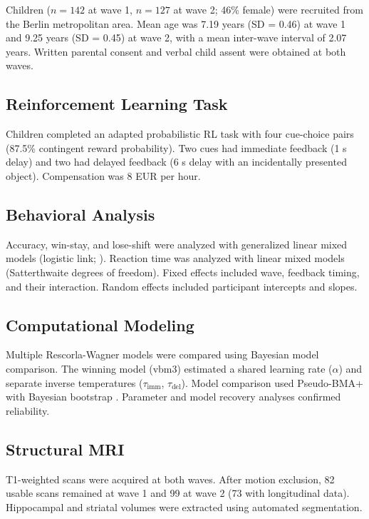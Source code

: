 \documentclass[11pt]{article}
\begin{document}
Children ($n = 142$ at wave 1, $n = 127$ at wave 2; 46\% female) were recruited from the Berlin metropolitan area. Mean age was 7.19 years (SD = 0.46) at wave 1 and 9.25 years (SD = 0.45) at wave 2, with a mean inter-wave interval of 2.07 years. Written parental consent and verbal child assent were obtained at both waves.

\subsection{Reinforcement Learning Task}

Children completed an adapted probabilistic RL task with four cue-choice pairs (87.5\% contingent reward probability). Two cues had immediate feedback (1 s delay) and two had delayed feedback (6 s delay with an incidentally presented object). Compensation was 8 EUR per hour.

\subsection{Behavioral Analysis}

Accuracy, win-stay, and lose-shift were analyzed with generalized linear mixed models (logistic link; \citealt{bates2015}). Reaction time was analyzed with linear mixed models (Satterthwaite degrees of freedom). Fixed effects included wave, feedback timing, and their interaction. Random effects included participant intercepts and slopes.

\subsection{Computational Modeling}

Multiple Rescorla-Wagner models \citep{rescorla1972} were compared using Bayesian model comparison. The winning model (vbm3) estimated a shared learning rate ($\alpha$) and separate inverse temperatures ($\tau_{\mathrm{imm}}$, $\tau_{\mathrm{del}}$). Model comparison used Pseudo-BMA+ with Bayesian bootstrap \citep{vehtari2017, yao2018}. Parameter and model recovery analyses confirmed reliability.

\subsection{Structural MRI}

T1-weighted scans were acquired at both waves. After motion exclusion, 82 usable scans remained at wave 1 and 99 at wave 2 (73 with longitudinal data). Hippocampal and striatal volumes were extracted using automated segmentation.
\end{document}
